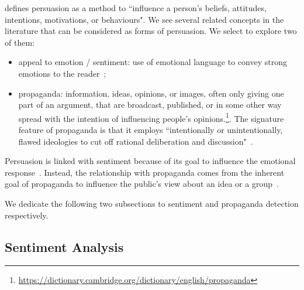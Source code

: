 \cite{gass2018persuasion} defines persuasion as a method to ``influence a person's beliefs, attitudes, intentions, motivations, or behaviours".
We see several related concepts in the literature that can be considered as forms of persuasion. We select to explore two of them:
\begin{itemize}
    \item appeal to emotion / sentiment: use of emotional language to convey strong emotions to the reader~\cite{ginosar2019patriotic}; %
    \item \gls{propaganda}:  information, ideas, opinions, or images, often only giving one part of an argument, that are broadcast, published, or in some other way spread with the intention of influencing people's opinions.\footnote{\url{https://dictionary.cambridge.org/dictionary/english/propaganda}}.
    The signature feature of propaganda is that it employs ``intentionally or unintentionally, flawed ideologies to cut off rational deliberation and discussion"~\cite{stanley2015propaganda}. %
\end{itemize}

Persuasion is linked with sentiment because of its goal to influence the emotional response~\citep{gatti2014sentiment,rocklage2018persuasion,petty2015emotion,desteno2004discrete}.
Instead, the relationship with propaganda comes from the inherent goal of propaganda to influence the public's view about an idea or a group~\citep{bernays,jowett2018propaganda}.

We dedicate the following two subsections to sentiment and propaganda detection respectively.

\subsection{\statusgreen Sentiment Analysis}
\label{sec:lit_sentiment}


